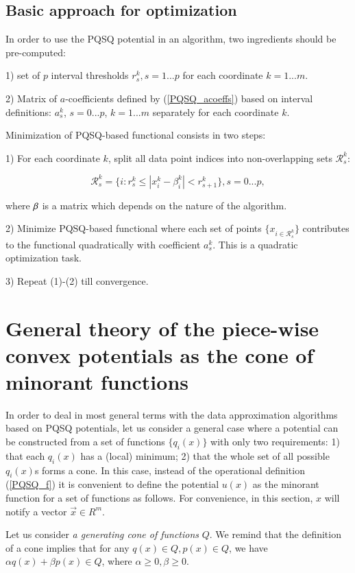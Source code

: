 \documentclass[preprint,12pt,twocolumn]{elsarticle}
\begin{document}
\subsection{Basic approach for optimization}

In order to use the PQSQ potential in an algorithm, two ingredients should be pre-computed:

1) set of $p$ interval thresholds $r_s^k, s=1...p$ for each coordinate $k=1...m$.

2) Matrix of $a$-coefficients defined by (\ref{PQSQ_acoeffs}) based on interval definitions: $a_s^k$, $s=0...p$, $k=1...m$ separately for each coordinate $k$.

Minimization of PQSQ-based functional consists in two steps:

1) For each coordinate $k$, split all data point indices into non-overlapping sets $\mathcal{R}_s^k$:

\begin{equation}
\mathcal{R}_s^k= \{i: r_{s}^k \leq |x_i^k-\beta^k_i| < r_{s+1}^k\}, s = 0...p,
\end{equation}

\noindent where $\bf{\beta}$ is a matrix which depends on the nature of the algorithm.

2) Minimize PQSQ-based functional where each set of points $\{x_{i\in \mathcal{R}_s^k}\}$ contributes
to the functional quadratically with coefficient $a_s^k$. This is a quadratic optimization task.

3) Repeat (1)-(2) till convergence.

\section{General theory of the piece-wise convex potentials as the cone of minorant functions}\label{ConvergenceSection}

In order to deal in most general terms with the data approximation algorithms based on PQSQ potentials, let us consider a general case where a potential can be constructed from a set of functions $\{q_i(x)\}$ with only two requirements: 1) that each $q_i(x)$ has a (local) minimum; 2) that the whole set of all possible $q_i(x)$s forms a cone. In this case, instead of the operational definition (\ref{PQSQ_f}) it is convenient to define the potential $u(x)$ as the minorant function for a set of functions as follows. For convenience, in this section, $x$ will notify a vector $\vec{x}\in R^m$.

Let us consider {\it a generating cone of functions} $Q$. We remind that the definition of a cone implies that for any $q(x)\in Q, p(x)\in Q$, we have $\alpha q(x)+\beta p(x)\in Q$, where $\alpha\geq 0, \beta \geq 0$.
\end{document}
